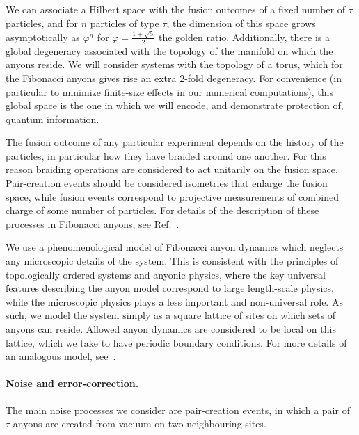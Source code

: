 \documentclass[aps, prl, letterpaper, twocolumn, superscriptaddress, notitlepage]{revtex4-1}
\begin{document}
We can associate a Hilbert space with the fusion outcomes of a fixed number of $\tau$ 
particles, and for $n$ particles of type $\tau$, the dimension of this space grows 
asymptotically as $\varphi^n$ for $\varphi=\frac{1+\sqrt{5}}{2}$ the golden ratio. Additionally, 
there is a global degeneracy associated with the topology of the manifold on which the 
anyons reside. We will consider systems with the topology of a torus, which for the Fibonacci 
anyons gives rise an extra 2-fold degeneracy. For convenience (in particular to minimize 
finite-size effects in our numerical computations), this global space is the one in which we will 
encode, and demonstrate protection of, quantum information.
	
The fusion outcome of any particular experiment depends on the history of the particles, in 
particular how they have braided around one another. For this reason braiding operations are 
considered to act unitarily on the fusion space. Pair-creation events should be considered 
isometries that enlarge the fusion space, while fusion events correspond to projective 
measurements of combined charge of some number of particles. For details of the description 
of these processes in Fibonacci anyons, see Ref.~\cite{Trebst2008}. 

We use a phenomenological model of Fibonacci anyon dynamics which neglects any 
microscopic details of the system. This is consistent with the principles of topologically 
ordered systems and anyonic physics, where the key universal features describing the anyon 
model correspond to large length-scale physics, while the microscopic physics plays a less 
important and non-universal role. As such, we model the system simply as a square lattice of 
sites on which sets of anyons can reside. Allowed anyon dynamics are considered to be local 
on this lattice, which we take to have periodic boundary conditions. For more details of an 
analogous model, see~\cite{Brell2013}.
	
\paragraph{Noise and error-correction.}

The main noise processes we consider are pair-creation events, in which a pair of $\tau$ anyons are created from vacuum on two neighbouring sites.
\end{document}
